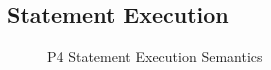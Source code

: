 \documentclass[UTF8]{article}
\begin{document}
\newpage
\subsection{Statement Execution}

\begin{figure}[h!]
\ottdefnsstmtXXsem
\caption{P4 Statement Execution Semantics}
\label{fig:semstmtexec}
\end{figure}

%
%

\printbibliography
\end{document}
